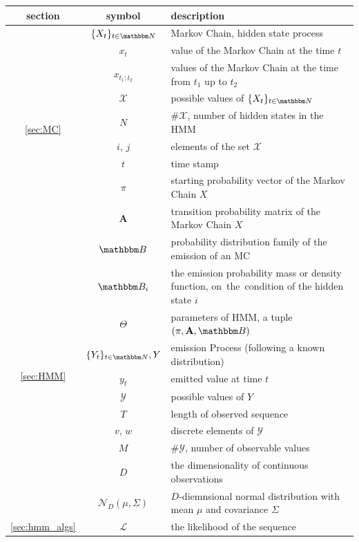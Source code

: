 \documentclass[shortabstract]{iithesis}
\begin{document}
\begin{table}[!ht]
    \centering
    \begin{tabular}{ |c|c|p{9.5cm}| }
 \hline
 section & symbol & description \\
 \hline
 \multirow{9}{*}{\ref{sec:MC}}
    & $\{X_t\}_{t \in \mathbbm N}$ & Markov Chain, hidden state process  \\ 
    & $x_t$ & value of the Markov Chain at the time $t$ \\ 
    & $x_{t_1:t_2}$ & values of the Markov Chain at the time from $t_1$ up  to $t_2$ \\ 
    & $\mathcal X$ & possible values of $\{X_t\}_{t \in \mathbbm N}$ \\ 
    & $N$ & $\# \mathcal X$, number of hidden states in the HMM \\ 
    & $i$, $j$ & elements of the set $\mathcal X$ \\ 
    & $t$ & time stamp \\
    & $\pi$ & starting probability vector of the Markov Chain $X$\\
    & $\textbf{A}$ & transition probability matrix of the Markov Chain $X$\\ \hline
 \multirow{11}{*}{\ref{sec:HMM}} 
    & $\mathbbm B$ & probability distribution family of the emission of an MC\\
    & $\mathbbm B_i$ & the emission probability mass or density function, on~the~condition of the hidden state $i$\\
    & $\Theta$ & parameters of HMM, a tuple $(\pi, \textbf{A}, \mathbbm B)$ \\
    & $\{Y_t\}_{t \in \mathbbm N}, Y$ & emission Process (following a known distribution) \\
    & $y_t$ & emitted value at time $t$ \\ 
    & $\mathcal Y$ & possible values of $Y$ \\ 
    & $T$ & length of observed sequence \\ 
    & $v$, $w$ & discrete elements of $\mathcal Y$ \\
    & $M$ &  $\# \mathcal Y$, number of observable values \\
    & $D$ & the dimensionality of continuous observations \\ 
    & $\mathcal N _D (\mu, \Sigma)$ & $D$-diemnsional normal distribution with mean $\mu$ and covariance $\Sigma$ \\ \hline
 \multirow{9}{*}{\ref{sec:hmm_algs}} 
    & $\mathcal L$ & the likelihood of the sequence \\

\end{tabular}
\end{table}
\end{document}
